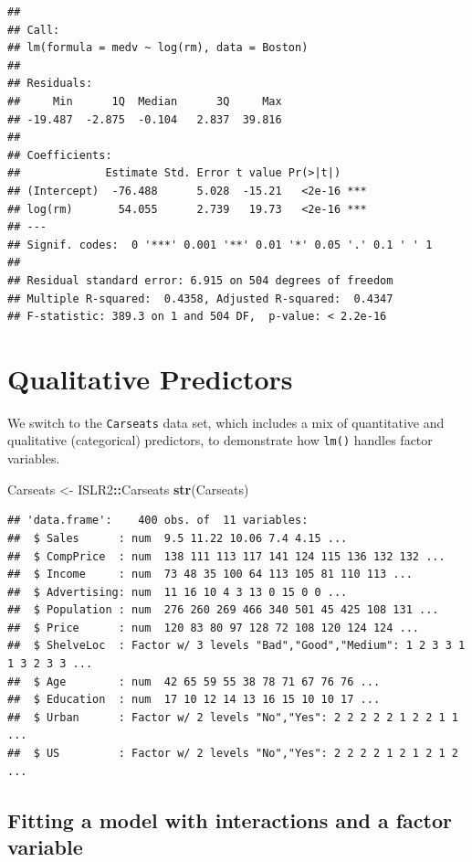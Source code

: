 \documentclass[
  11pt,
]{article}
\newenvironment{Shaded}{\begin{snugshade}}{\end{snugshade}}
\newcommand{\FunctionTok}[1]{\textcolor[rgb]{0.13,0.29,0.53}{\textbf{#1}}}
\newcommand{\NormalTok}[1]{#1}
\newcommand{\OtherTok}[1]{\textcolor[rgb]{0.56,0.35,0.01}{#1}}
\newcommand{\SpecialCharTok}[1]{\textcolor[rgb]{0.81,0.36,0.00}{\textbf{#1}}}
\begin{document}
\begin{verbatim}
## 
## Call:
## lm(formula = medv ~ log(rm), data = Boston)
## 
## Residuals:
##     Min      1Q  Median      3Q     Max 
## -19.487  -2.875  -0.104   2.837  39.816 
## 
## Coefficients:
##             Estimate Std. Error t value Pr(>|t|)    
## (Intercept)  -76.488      5.028  -15.21   <2e-16 ***
## log(rm)       54.055      2.739   19.73   <2e-16 ***
## ---
## Signif. codes:  0 '***' 0.001 '**' 0.01 '*' 0.05 '.' 0.1 ' ' 1
## 
## Residual standard error: 6.915 on 504 degrees of freedom
## Multiple R-squared:  0.4358, Adjusted R-squared:  0.4347 
## F-statistic: 389.3 on 1 and 504 DF,  p-value: < 2.2e-16
\end{verbatim}

\section{Qualitative Predictors}\label{qualitative-predictors}

We switch to the \texttt{Carseats} data set, which includes a mix of
quantitative and qualitative (categorical) predictors, to demonstrate
how \texttt{lm()} handles factor variables.

\begin{Shaded}
\begin{Highlighting}[]
\NormalTok{Carseats }\OtherTok{\textless{}{-}}\NormalTok{ ISLR2}\SpecialCharTok{::}\NormalTok{Carseats}
\FunctionTok{str}\NormalTok{(Carseats)}
\end{Highlighting}
\end{Shaded}

\begin{verbatim}
## 'data.frame':    400 obs. of  11 variables:
##  $ Sales      : num  9.5 11.22 10.06 7.4 4.15 ...
##  $ CompPrice  : num  138 111 113 117 141 124 115 136 132 132 ...
##  $ Income     : num  73 48 35 100 64 113 105 81 110 113 ...
##  $ Advertising: num  11 16 10 4 3 13 0 15 0 0 ...
##  $ Population : num  276 260 269 466 340 501 45 425 108 131 ...
##  $ Price      : num  120 83 80 97 128 72 108 120 124 124 ...
##  $ ShelveLoc  : Factor w/ 3 levels "Bad","Good","Medium": 1 2 3 3 1 1 3 2 3 3 ...
##  $ Age        : num  42 65 59 55 38 78 71 67 76 76 ...
##  $ Education  : num  17 10 12 14 13 16 15 10 10 17 ...
##  $ Urban      : Factor w/ 2 levels "No","Yes": 2 2 2 2 2 1 2 2 1 1 ...
##  $ US         : Factor w/ 2 levels "No","Yes": 2 2 2 2 1 2 1 2 1 2 ...
\end{verbatim}

\subsection{Fitting a model with interactions and a factor
variable}\label{fitting-a-model-with-interactions-and-a-factor-variable}
\end{document}
